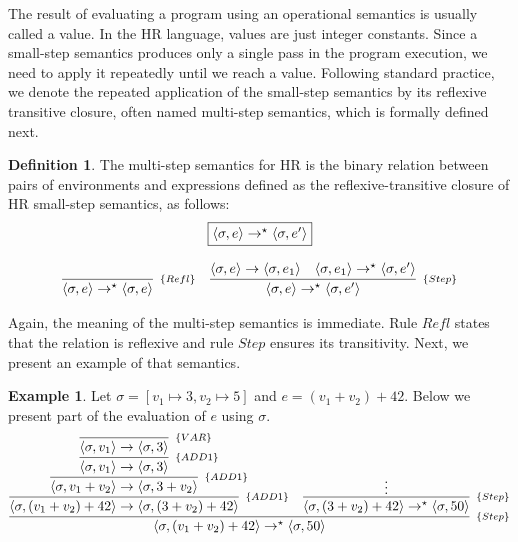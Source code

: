 \documentclass[oneside,12pt]{scrbook}
\theoremstyle{definition}
\newtheorem{Example}{Example}
\theoremstyle{plain}
\theoremstyle{definition}
\newtheorem{Definition}{Definition}
\begin{document}
The result of evaluating a program using an operational semantics is usually called a value. In the HR language,
values are just integer constants. Since a small-step semantics produces only a single pass in the
program execution, we need to apply it repeatedly until we reach a value. Following standard practice,
we denote the repeated application of the small-step semantics by its reflexive transitive closure, often
named multi-step semantics, which is formally defined next.

\begin{Definition}
	The multi-step semantics for HR is the binary relation between pairs of environments and
	expressions defined as the reflexive-transitive closure of HR small-step semantics, as follows:
	\[
	\begin{array}{c}
	\fbox{$\langle \sigma,e\rangle \to^\star \langle \sigma, e'\rangle$} \\ \\
	\begin{array}{cc}
	\infer[_{\{Refl\}}]
	{\langle \sigma, e\rangle \to^\star \langle \sigma, e\rangle}{} &
	\infer[_{\{Step\}}]
	{\langle \sigma, e \rangle \to^\star \langle \sigma, e' \rangle}
	{\langle \sigma, e \rangle \to \langle \sigma, e_1 \rangle &
		\langle \sigma, e_1 \rangle \to^\star \langle \sigma, e' \rangle}
	\end{array}
	\end{array}
	\]
\end{Definition}

Again, the meaning of the multi-step semantics is immediate. Rule $Refl$ states that the relation is reflexive and rule $Step$ ensures its transitivity. Next, we present an example of that semantics.

\begin{Example}
	Let $\sigma = [v_1\mapsto 3, v_2\mapsto 5]$ and $e = (v_1 + v_2) + 42$. Below we present part of the evaluation of
	$e$ using $\sigma$.
	\[
	\infer[_{\{Step\}}]
	{\langle \sigma, (v_1 + v_2) + 42 \rangle \to^\star \langle \sigma, 50 \rangle}
	{
		\infer[_{\{ADD1\}}]
		{\langle \sigma, (v_1 + v_2) + 42 \rangle \to \langle \sigma, (3 + v_2) + 42 \rangle}
		{
			\infer[_{\{ADD1\}}]
			{\langle \sigma, v_1 + v_2 \rangle \to \langle \sigma, 3 + v_2 \rangle}
			{
				\infer[_{\{ADD1\}}]
				{\langle \sigma, v_1 \rangle \to \langle \sigma, 3 \rangle}
				{
					\infer[_{\{VAR\}}]
					{\langle \sigma, v_1 \rangle \to \langle \sigma, 3 \rangle}{}
				}
			} 
		}
		&
		\infer[_{\{Step\}}]
		{\langle \sigma, (3 + v_2) + 42 \rangle \to^\star \langle \sigma, 50 \rangle}{\vdots}
	}
	\]
\end{Example}
\end{document}
